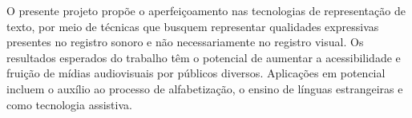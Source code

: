 \documentclass[a4paper,11pt,titlepage,singlespacing]{article}
\newcommand\todo[1]{\textcolor{red}{#1}}
\begin{document}
O presente projeto propõe o aperfeiçoamento nas tecnologias de representação de texto, por meio de técnicas que busquem representar qualidades expressivas presentes no registro sonoro e não necessariamente no registro visual. Os resultados esperados do trabalho têm o potencial de aumentar a acessibilidade e fruição de mídias audiovisuais por públicos diversos. Aplicações em potencial incluem o auxílio ao processo de alfabetização, o ensino de línguas estrangeiras e como tecnologia assistiva.










\newpage
\end{document}
